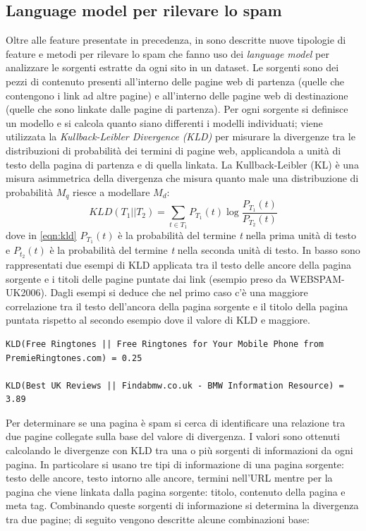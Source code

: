 \subsection{Language model per rilevare lo spam}
Oltre alle feature presentate in precedenza, in \cite{Martinez-Romo:2009:WSI:1531914.1531920} sono descritte nuove tipologie di feature e metodi per rilevare lo spam che fanno uso dei \textit{language model}  per analizzare le sorgenti estratte da ogni sito in un dataset. Le sorgenti sono dei pezzi di contenuto presenti all'interno delle pagine web di partenza (quelle che contengono i link ad altre pagine) e all'interno delle pagine web di destinazione (quelle che sono linkate dalle pagine di partenza). Per ogni sorgente si definisce un modello e si calcola quanto siano differenti i modelli individuati; viene utilizzata la \textit{Kullback-Leibler Divergence (KLD)} per misurare la divergenze tra le distribuzioni di probabilità dei termini di pagine web, applicandola a unità di testo della pagina di partenza e di quella linkata. La Kullback-Leibler (KL) è una misura  asimmetrica della divergenza che misura quanto male una distribuzione di probabilità \(M_q\) riesce a modellare \(M_d\):
\begin{equation}
KLD(T_1||T_2) = \sum_{t \in T_1} P_{T_1}(t) \log \frac{P_{T_1}(t)}{P_{T_2}(t)}
\label{eqn:kld}
\end{equation}
dove in \ref{eqn:kld} \(P_{T_1}(t)\) è la probabilità del termine \textit{t} nella prima unità di testo e \(P_{t_2}(t)\) è la probabilità del termine \textit{t} nella seconda unità di testo. In basso sono rappresentati due esempi di KLD applicata tra il testo delle ancore della pagina sorgente e i titoli delle pagine puntate dai link (esempio preso da WEBSPAM-UK2006). Dagli esempi si deduce che nel primo caso c'è una maggiore correlazione tra il testo dell'ancora della pagina sorgente e il titolo della pagina puntata rispetto al secondo esempio dove il valore di KLD e maggiore.
\begin{lstlisting}[frame=trbl,postbreak=\space, breakindent=5pt, breaklines]
KLD(Free Ringtones || Free Ringtones for Your Mobile Phone from PremieRingtones.com) = 0.25

KLD(Best UK Reviews || Findabmw.co.uk - BMW Information Resource) = 3.89
\end{lstlisting}
Per determinare se una pagina è spam si cerca di identificare una relazione tra due pagine collegate sulla base del valore di divergenza. I valori sono ottenuti calcolando le divergenze con KLD tra una o più sorgenti di informazioni da ogni pagina. In particolare si usano tre tipi di informazione di una pagina sorgente: testo delle ancore, testo intorno alle ancore, termini nell'URL mentre per la pagina che viene linkata dalla pagina sorgente: titolo, contenuto della pagina e meta tag. Combinando queste sorgenti di informazione si determina la divergenza tra due pagine; di seguito vengono descritte alcune combinazioni base:
